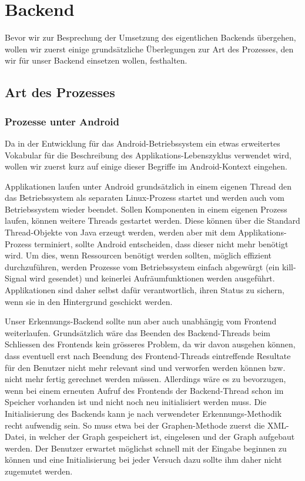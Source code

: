 \chapter{Backend}

Bevor wir zur Besprechung der Umsetzung des eigentlichen Backends übergehen, wollen wir zuerst einige grundsätzliche Überlegungen zur Art des Prozesses, den wir für unser Backend einsetzen wollen, festhalten.

\section{Art des Prozesses}\label{lbl_prozess_art}

\subsection{Prozesse unter Android}\label{lbl_be_procandroid}

Da in der Entwicklung für das Android-Betriebssystem ein etwas erweitertes Vokabular für die Beschreibung des Applikations-Lebenszyklus verwendet wird, wollen wir zuerst kurz auf einige dieser Begriffe im Android-Kontext eingehen.

Applikationen laufen unter Android grundsätzlich in einem eigenen Thread den das Betriebssystem als separaten Linux-Prozess startet und werden auch vom Betriebssystem wieder beendet. Sollen Komponenten in einem eigenen Prozess laufen, können weitere Threads gestartet werden\cite{adglc}. Diese können über die Standard Thread-Objekte von Java erzeugt werden, werden aber mit dem Applikations-Prozess terminiert, sollte Android entscheiden, dass dieser nicht mehr benötigt wird. Um dies, wenn Ressourcen benötigt werden sollten, möglich effizient durchzuführen, werden Prozesse vom Betriebssystem einfach abgewürgt (ein kill-Signal wird gesendet) und keinerlei Aufräumfunktionen werden ausgeführt. Applikationen sind daher selbst dafür verantwortlich, ihren Status zu sichern, wenn sie in den Hintergrund geschickt werden\cite{adbmt}.

Unser Erkennungs-Backend sollte nun aber auch unabhängig vom Frontend weiterlaufen. Grundsätzlich wäre das Beenden des Backend-Threads beim Schliessen des Frontends kein grösseres Problem, da wir davon ausgehen können, dass eventuell erst nach Beendung des Frontend-Threads eintreffende Resultate für den Benutzer nicht mehr relevant sind und verworfen werden können bzw. nicht mehr fertig gerechnet werden müssen. Allerdings wäre es zu bevorzugen, wenn bei einem erneuten Aufruf des Frontends der Backend-Thread schon im Speicher vorhanden ist und nicht noch neu initialisiert werden muss. Die Initialisierung des Backends kann je nach verwendeter Erkennungs-Methodik recht aufwendig sein. So muss etwa bei der Graphen-Methode zuerst die XML-Datei, in welcher der Graph gespeichert ist, eingelesen und der Graph aufgebaut werden. Der Benutzer erwartet möglichst schnell mit der Eingabe beginnen zu können und eine Initialisierung bei jeder Versuch dazu sollte ihm daher nicht zugemutet werden.

